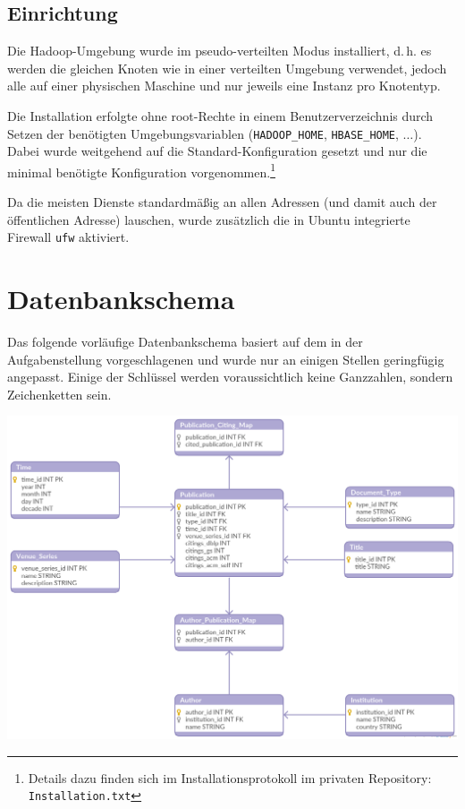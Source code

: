 \documentclass[a4paper,11pt,utf8]{scrartcl}
\begin{document}
\subsection{Einrichtung}

Die Hadoop-Umgebung wurde im pseudo-verteilten Modus installiert, d.\,h. es werden die gleichen Knoten wie in einer verteilten Umgebung verwendet, jedoch alle auf einer physischen Maschine und nur jeweils eine Instanz pro Knotentyp.

Die Installation erfolgte ohne root-Rechte in einem Benutzerverzeichnis durch Setzen der benötigten Umgebungsvariablen (\texttt{HADOOP\_HOME}, \texttt{HBASE\_HOME}, $\dots$). Dabei wurde weitgehend auf die Standard-Konfiguration gesetzt und nur die minimal benötigte Konfiguration vorgenommen.\footnote{Details dazu finden sich im Installationsprotokoll im privaten Repository: \texttt{Installation.txt}}

Da die meisten Dienste standardmäßig an allen Adressen (und damit auch der öffentlichen Adresse) lauschen, wurde zusätzlich die in Ubuntu integrierte Firewall \texttt{ufw} aktiviert.

\section{Datenbankschema}

Das folgende vorläufige Datenbankschema basiert auf dem in der Aufgabenstellung vorgeschlagenen und wurde nur an einigen Stellen geringfügig angepasst. Einige der Schlüssel werden voraussichtlich keine Ganzzahlen, sondern Zeichenketten sein.

\noindent
\includegraphics[width=\textwidth]{schema.png}
\end{document}
